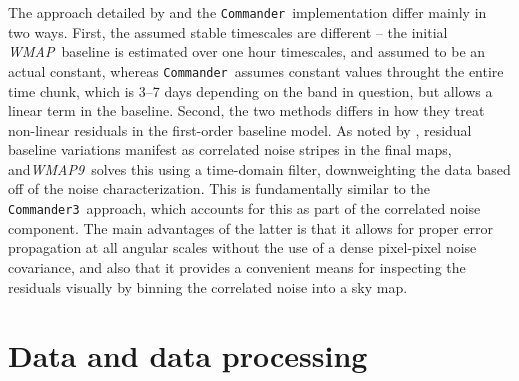 \documentclass[twocolumn]{../../common/aa}
\def\WMAP{\emph{WMAP}}
\def\WMAPnine{\emph{WMAP9}}
\def\commander{\texttt{Commander}}
\def\commanderthree{\texttt{Commander3}}
\begin{document}
The approach detailed by \citet{hinshaw2003a} and the
\commander\ implementation differ mainly in two ways. First, the
assumed stable timescales are different -- the initial
\WMAP\ baseline is estimated over one hour timescales, and assumed to
be an actual constant, whereas \commander\ assumes constant values
throught the entire time chunk, which is 3--7 days depending on the
band in question, but allows a linear term in the baseline. Second,
the two methods differs in how they treat non-linear residuals in the
first-order baseline model.  As noted by \citet{hinshaw2003a},
residual baseline variations manifest as correlated noise stripes in
the final maps, and\WMAPnine\ solves this using a time-domain filter,
downweighting the data based off of the noise characterization. This
is fundamentally similar to the \commanderthree\ approach, which
accounts for this as part of the correlated noise component. The main
advantages of the latter is that it allows for proper error
propagation at all angular scales without the use of a dense
pixel-pixel noise covariance, and also that it provides a convenient
means for inspecting the residuals visually by binning the correlated
noise into a sky map.

\section{Data and data processing}
\label{sec:data}
\end{document}
